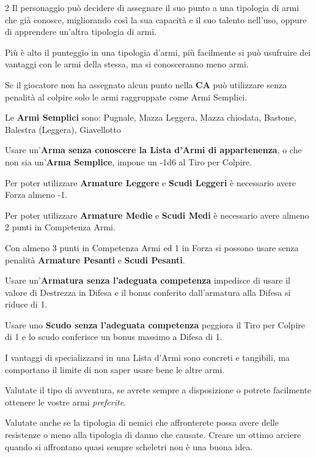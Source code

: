 \begin{multicols}{2}
Il personaggio può decidere di assegnare il suo punto a una tipologia di armi che già conosce, migliorando così la sua capacità e il suo talento nell'uso, oppure di apprendere un'altra tipologia di armi.

Più è alto il punteggio in una tipologia d'armi, più facilmente si può usufruire dei vantaggi con le armi della stessa, ma si conosceranno meno armi.

Se il giocatore non ha assegnato alcun punto nella \textbf{CA} può utilizzare senza penalità al colpire solo le armi raggruppate come Armi Semplici.

Le \textbf{Armi Semplici} sono: Pugnale, Mazza Leggera, Mazza chiodata, Bastone, Balestra (Leggera), Giavellotto

Usare un'\textbf{Arma senza conoscere la Lista d'Armi di appartenenza}, o che non sia un'\textbf{Arma Semplice}, impone un -1d6 al Tiro per Colpire.

Per poter utilizzare \textbf{Armature Leggere} e \textbf{Scudi Leggeri} è necessario avere Forza almeno -1.\label{indossarearmature}\hypertarget{indossarearmature}{}

Per poter utilizzare \textbf{Armature Medie} e \textbf{Scudi Medi} è necessario avere almeno 2 punti in Competenza Armi.

Con almeno 3 punti in Competenza Armi ed 1 in Forza si possono usare senza penalità \textbf{Armature Pesanti} e \textbf{Scudi Pesanti}.

Usare un'\textbf{Armatura senza l'adeguata competenza} impedisce di usare il valore di Destrezza in Difesa e il bonus conferito dall'armatura alla Difesa si riduce di 1.

Usare uno \textbf{Scudo senza l'adeguata competenza} peggiora il Tiro per Colpire di 1 e lo scudo conferisce un bonus massimo a Difesa di 1.


\begin{giocatore}
I vantaggi di specializzarsi in una Lista d'Armi sono concreti e tangibili, ma comportano il limite di non saper usare bene le altre armi.

Valutate il tipo di avventura, se avrete sempre a disposizione o potrete facilmente ottenere le vostre armi \emph{preferite}.

Valutate anche se la tipologia di nemici che affronterete possa avere delle resistenze o meno alla tipologia di danno che causate. Creare un ottimo arciere quando si affrontano quasi sempre scheletri non è una buona idea.
\end{giocatore}


\end{multicols}
